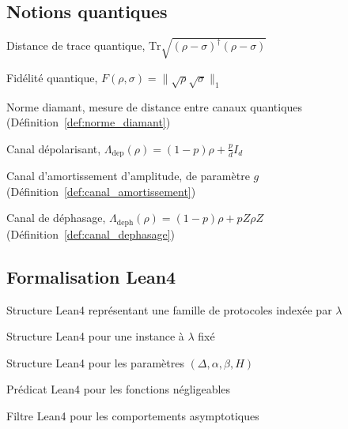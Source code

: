 \begin{sloppypar}
\subsection*{Notions quantiques}

\begin{description}[style=nextline,leftmargin=1.6cm,font=\normalfont\bfseries]
\item[$\|\rho - \sigma\|_1$] Distance de trace quantique, $\mathrm{Tr}\sqrt{(\rho-\sigma)^\dagger(\rho-\sigma)}$
\item[$F(\rho,\sigma)$] Fid\'elit\'e quantique, $F(\rho,\sigma) = \|\sqrt{\rho}\sqrt{\sigma}\|_1$
\item[$\|\Phi\|_\diamond$] Norme diamant, mesure de distance entre canaux quantiques (D\'efinition~\ref{def:norme_diamant})
\item[$\Lambda_{\mathrm{dep}}$] Canal d\'epolarisant, $\Lambda_{\mathrm{dep}}(\rho) = (1-p)\rho + \frac{p}{d}I_d$
\item[$\Lambda_{\mathrm{AD}}$] Canal d'amortissement d'amplitude, de param\`etre $g$ (D\'efinition~\ref{def:canal_amortissement})
\item[$\Lambda_{\mathrm{deph}}$] Canal de d\'ephasage, $\Lambda_{\mathrm{deph}}(\rho) = (1-p)\rho + pZ\rho Z$ (D\'efinition~\ref{def:canal_dephasage})
\end{description}

\subsection*{Formalisation Lean4}

\begin{description}[style=nextline,leftmargin=4.3cm,font=\normalfont\bfseries]
\item[\texttt{ProtocolFamily}] Structure Lean4 repr\'esentant une famille de protocoles index\'ee par $\lambda$
\item[\texttt{ProtocolInstance}] Structure Lean4 pour une instance \`a $\lambda$ fix\'e
\item[\texttt{InstitutionalParams}] Structure Lean4 pour les param\`etres $(\Delta, \alpha, \beta, H)$
\item[\texttt{Negligible}] Pr\'edicat Lean4 pour les fonctions n\'egligeables
\item[\texttt{atTop}] Filtre Lean4 pour les comportements asymptotiques
\end{description}


\end{sloppypar}
